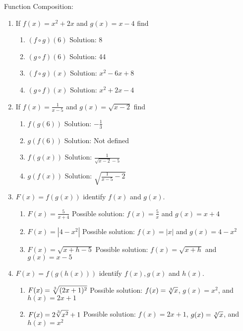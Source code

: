 \documentclass[11pt]{report}
\begin{document}
Function Composition:
\begin{enumerate}
\item If $f(x)=x^2+2x$ and $g(x)=x-4$ find
\begin{enumerate}[label=\alph*.]
\item $(f \circ g)(6)$      Solution: 8
\item $(g \circ f)(6)$      Solution: 44
\item $(f \circ g)(x)$	Solution: $x^2-6x+8$
\item $(g \circ f)(x)$	Solution: $x^2+2x-4$
\end{enumerate}

\item If $\displaystyle{f(x)=\frac{1}{x-5}}$ and $g(x)=\sqrt {x-2}$ find
\begin{enumerate}[label=\alph*.]
\item $f(g(6))$	Solution: $-\frac{1}{3}$
\item $g(f(6))$	Solution: Not defined
\item $f(g(x))$	Solution: $\displaystyle \frac{1}{\sqrt{x-2}-5}$
\item $g(f(x))$	Solution: $\displaystyle \sqrt{\frac{1}{x-5}-2}$
\end{enumerate}

\item $F(x) = f(g(x))$ identify $f(x)$ and $g(x)$.
\begin{enumerate}[label=\alph*.]
\item $F(x) = \frac {5}{x+4}$	Possible solution: $f(x)=\frac{5}{x}$ and $g(x)=x+4$
\item $F(x) =  |{4-x^2}|$		Possible solution: $f(x)=|x|$ and $g(x)=4-x^2$
\item $\displaystyle F(x) = \sqrt {x+h - 5}$	Possible solution: $f(x)=\sqrt{x+h}$ and $g(x)=x-5$
\end{enumerate}

\item $F(x) = f(g(h(x)))$ identify $f(x), g(x)$ and $h(x)$.
\begin{enumerate}[label=\alph*.]
\item $\displaystyle F(x) = \root 3 \of {(2x+1)^2}$	Possible solution: $f(x)=\root 3 \of {x}$, $g(x)=x^2$, and $h(x)=2x+1$
\item $\displaystyle F(x) = 2 \root 3 \of{x^2} +1$ 	Possible solution: $f(x)=2x+1$, $g(x)=\root 3 \of {x}$, and $h(x)=x^2$
\end{enumerate}
\end{enumerate}
\end{document}
